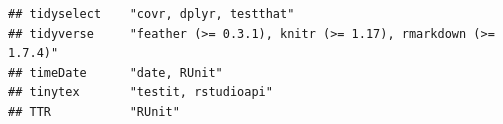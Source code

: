 \documentclass[]{article}
\begin{document}
\begin{verbatim}
## tidyselect    "covr, dplyr, testthat"                                                                                                                                                                                                                                                                                                                                                                                                                                                                                                                                                                   
## tidyverse     "feather (>= 0.3.1), knitr (>= 1.17), rmarkdown (>= 1.7.4)"                                                                                                                                                                                                                                                                                                                                                                                                                                                                                                                               
## timeDate      "date, RUnit"                                                                                                                                                                                                                                                                                                                                                                                                                                                                                                                                                                             
## tinytex       "testit, rstudioapi"                                                                                                                                                                                                                                                                                                                                                                                                                                                                                                                                                                      
## TTR           "RUnit"                                                                                                                                                                                                                                                                                                                                                                                                                                                                                                                                                                                   

\end{verbatim}
\end{document}
